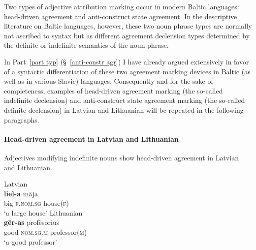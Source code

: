 Two types of adjective attribution marking occur in modern Baltic languages: head-driven agreement and anti-construct state agreement. In the descriptive literature on Baltic languages, however, these two noun phrase types are normally not ascribed to syntax but as different agreement declension types determined by the definite or indefinite semantics of the noun phrase.

In Part~\ref{part typ} (\S~\ref{anti-constr agr}) I have already argued extensively in favor of a syntactic differentiation of these two agreement marking devices in Baltic (as well as in various Slavic) languages. Consequently and for the sake of completeness, examples of head-driven agreement marking (the so-called indefinite declension) and anti-construct state agreement marking (the so-called definite declension) in Latvian and Lithuanian will be repeated in the following paragraphs.

\paragraph{Head-driven agreement in Latvian and Lithuanian} 
Adjectives modifying indefinite nouns show head-driven agreement in Latvian and Lithuanian.
\begin{exe}
\ex 
\begin{xlist}
\ex \rm{Latvian \citep[example from][115]{dahl2007}}\\
\gll 	\textbf{liel-a} māja\\
	big-\textsc{f.nom.sg} house(\textsc{f})\\
\glt	‘a large house’
\ex \rm{Lithuanian \citep[13]{bechert1993}}\\
\gll 	\textbf{gēr-as}			profèsorius\\
	good-\textsc{nom.sg.m} professor(\textsc{m})\\
\glt	‘a good professor’
\end{xlist}
\end{exe}

